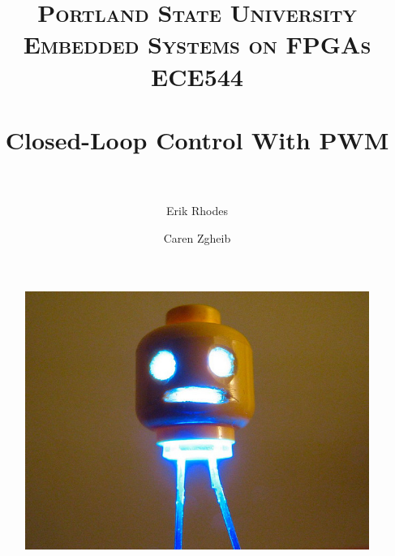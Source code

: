 \documentclass[11pt]{article}
\title{	
\normalfont \normalsize 
\textsc{\LARGE Portland State University}\\[1.5cm] %
\textsc{\Large Embedded Systems on FPGAs}\\[0.5cm] %
\textsc{\large ECE544}\\[0.5cm] %
\horrule{1.2pt} \\[0.4cm] %
\huge Closed-Loop Control With PWM \\ %
\horrule{1.2pt} \\[0.5cm] %
}
\begin{document}
\raggedright
\author{Erik Rhodes \and Caren Zgheib} %
\maketitle %
\thispagestyle{empty}


\begin{figure}[h]\centering
\includegraphics[height=0.65\textwidth]{images/LED_halloween.jpg}
		\label{LED}
	\end{figure}
	
\newpage


\end{document}
